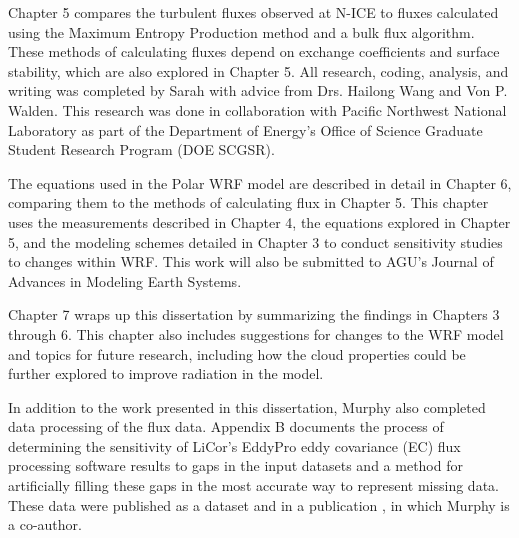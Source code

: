 Chapter 5 compares the turbulent fluxes observed at N-ICE to fluxes calculated using the Maximum Entropy Production method and a bulk flux algorithm. These methods of calculating fluxes depend on exchange coefficients and surface stability, which are also explored in Chapter 5. All research, coding, analysis, and writing was completed by Sarah with advice from Drs. Hailong Wang and Von P. Walden. This research was done in collaboration with Pacific Northwest National Laboratory as part of the Department of Energy's Office of Science Graduate Student Research Program (DOE SCGSR). 

The equations used in the Polar WRF model are described in detail in Chapter 6, comparing them to the methods of calculating flux in Chapter 5. This chapter uses the measurements described in Chapter 4, the equations explored in Chapter 5, and the modeling schemes detailed in Chapter 3 to conduct sensitivity studies to changes within WRF. This work will also be submitted to AGU's Journal of Advances in Modeling Earth Systems.

Chapter 7 wraps up this dissertation by summarizing the findings in Chapters 3 through 6. This chapter also includes suggestions for changes to the WRF model and topics for future research, including how the cloud properties could be further explored to improve radiation in the model.

In addition to the work presented in this dissertation, Murphy also completed data processing of the flux data. Appendix B documents the process of determining the sensitivity of LiCor's EddyPro eddy covariance (EC) flux processing software results to gaps in the input datasets and a method for artificially filling these gaps in the most accurate way to represent missing data. These data were published as a dataset \citep{niceflux} and in a publication \citep{walden:2017}, in which Murphy is a co-author.




